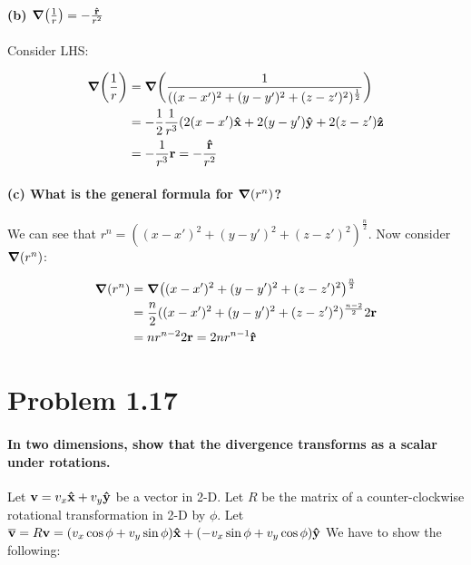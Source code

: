 \documentclass{article}
\numberwithin{equation}{section}
\begin{document}
\paragraph{(b) $\grad(\frac{1}{r}) = - \frac{\vb{\hat{r}}}{r^2}$\\}

Consider LHS:

\begin{equation}
\begin{split}
    \grad(\frac{1}{r}) &= \grad (\frac{1}{((x-x')^2 + (y-y')^2 + (z-z')^2)^\frac{1}{2}}) \\
    &= -\frac{1}{2}\frac{1}{r^3} ( 2(x-x') \vb{\hat{x}} + 2(y-y') \vb{\hat{y}} + 2(z-z') \vb{\hat{z}} \\
    &= - \frac{1}{r^3} \vb{r} = - \frac{\vb{\hat{r}}}{r^2}
    \end{split}
\end{equation}

\paragraph{(c) What is the general formula for $\grad(r^n)$?\\}

We can see that $r^n = ((x-x')^2 + (y-y')^2 + (z-z')^2)^\frac{n}{2}$. Now consider $\grad (r^n)$:

\begin{equation}
    \begin{split}
        \grad (r^n) &= \grad ((x-x')^2 + (y-y')^2 + (z-z')^2)^\frac{n}{2} \\
        &= \frac{n}{2} ((x-x')^2 + (y-y')^2 + (z-z')^2)^{\frac{n-2}{2}} 2 \vb{r} \\
        &= nr^{n-2} 2\vb{r} = 2n r^{n-1} \vb{\hat{r}}
    \end{split}
\end{equation}

\section{Problem 1.17}

\paragraph{In two dimensions, show that the divergence transforms as a scalar
under rotations.\\}

Let $\vb{v} = v_x \vb{\hat{x}} + v_y \vb{\hat{y}}$ be a vector in 2-D. Let $R$ be the matrix of a counter-clockwise rotational transformation in 2-D by $\phi$. Let $\overline{\vb{v}} = R \vb{v} = (v_x \cos \phi + v_y \sin \phi) \vb{\hat{x}} + (- v_x \sin \phi + v_y \cos \phi) \vb{\hat{y}}$ We have to show the following:
\end{document}
